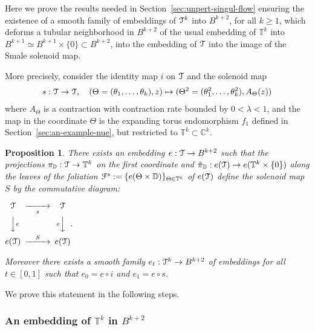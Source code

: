 \documentclass[reqno,12pt,a4paper]{amsart}
\theoremstyle{plain}
\newtheorem{proposition}[theorem]{Proposition}
\theoremstyle{definition}
\begin{document}
Here we prove the results needed in
Section~\ref{sec:unpert-singul-flow} ensuring the existence
of a smooth family of embeddings of ${\EuScript{T}}^k$ into $B^{k+2}$,
for all $k\ge1$, which deforms a tubular neighborhood in
$B^{k+2}$ of the usual embedding of ${{\mathbb T}}^k$ into
$B^{k+1}\simeq B^{k+1}\times\{0\}\subset B^{k+2}$, into the
embedding of ${\EuScript{T}}$ into the image of the Smale solenoid map.

More precisely, consider the identity map $i$ on ${\EuScript{T}}$ and
the solenoid map
\begin{align*}
  s:{\EuScript{T}}\to{\EuScript{T}}, \quad
  (\Theta=(\theta_1,\dots,\theta_k),z)\mapsto
  (\Theta^2=(\theta_1^2,\dots,\theta_k^2), A_\Theta(z))
\end{align*}
where $A_\Theta$ is a contraction with contraction rate
bounded by $0<\lambda<1$, and the map in the coordinate
$\Theta$ is the expanding torus endomorphism $f_1$ defined
in Section~\ref{sec:an-example-nue}, but restricted to
${{\mathbb T}}^k\subset{{\mathbb C}}^k$.

\begin{proposition}\label{pr:embedding}
  There exists an embedding $e:{\EuScript{T}}\to B^{k+2}$ such that the
  projections $\pi_{{\mathbb D}}:{\EuScript{T}}\to{{\mathbb T}}^k$ on the first coordinate
  and $\tilde\pi_{{\mathbb D}}:e({\EuScript{T}})\to e({{\mathbb T}}^k\times\{0\})$ along
  the leaves of the foliation ${\EuScript{F}}^s:=\{ e(\Theta\times{{\mathbb D}})
  \}_{\Theta\in{{\mathbb T}}^k}$ of $e({\EuScript{T}})$ define the solenoid map
  $S$ by the commutative diagram:
  \begin{center}
    $\begin{CD} {\EuScript{T}} @>>{s}> {\EuScript{T}}
      \\
      @VV{e}V @V{e}VV
      \\
      e({\EuScript{T}}) @>{S}>> e({\EuScript{T}})
    \end{CD}.$
  \end{center}
  Moreover there exists a smooth family $e_t:{\EuScript{T}}^k\to B^{k+2}$
  of embeddings for all $t\in[0,1]$ such that $e_0=e\circ i$
  and $e_1=e\circ s$.
\end{proposition}

We prove this statement in the following steps.

\subsubsection{An embedding of ${{\mathbb T}}^k$ in $B^{k+2}$}
\label{sec:embedd-ttk-bk+1}
\end{document}
